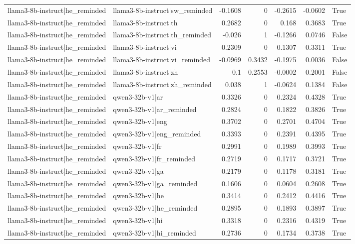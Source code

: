 \begin{table}
\begin{tabular}{l l r r r r l}
llama3-8b-instruct|he_reminded & llama3-8b-instruct|sw_reminded & -0.1608 & 0 & -0.2615 & -0.0602 & True \\
llama3-8b-instruct|he_reminded & llama3-8b-instruct|th & 0.2682 & 0 & 0.168 & 0.3683 & True \\
llama3-8b-instruct|he_reminded & llama3-8b-instruct|th_reminded & -0.026 & 1 & -0.1266 & 0.0746 & False \\
llama3-8b-instruct|he_reminded & llama3-8b-instruct|vi & 0.2309 & 0 & 0.1307 & 0.3311 & True \\
llama3-8b-instruct|he_reminded & llama3-8b-instruct|vi_reminded & -0.0969 & 0.3432 & -0.1975 & 0.0036 & False \\
llama3-8b-instruct|he_reminded & llama3-8b-instruct|zh & 0.1 & 0.2553 & -0.0002 & 0.2001 & False \\
llama3-8b-instruct|he_reminded & llama3-8b-instruct|zh_reminded & 0.038 & 1 & -0.0624 & 0.1384 & False \\
llama3-8b-instruct|he_reminded & qwen3-32b-v1|ar & 0.3326 & 0 & 0.2324 & 0.4328 & True \\
llama3-8b-instruct|he_reminded & qwen3-32b-v1|ar_reminded & 0.2824 & 0 & 0.1822 & 0.3826 & True \\
llama3-8b-instruct|he_reminded & qwen3-32b-v1|eng & 0.3702 & 0 & 0.2701 & 0.4704 & True \\
llama3-8b-instruct|he_reminded & qwen3-32b-v1|eng_reminded & 0.3393 & 0 & 0.2391 & 0.4395 & True \\
llama3-8b-instruct|he_reminded & qwen3-32b-v1|fr & 0.2991 & 0 & 0.1989 & 0.3993 & True \\
llama3-8b-instruct|he_reminded & qwen3-32b-v1|fr_reminded & 0.2719 & 0 & 0.1717 & 0.3721 & True \\
llama3-8b-instruct|he_reminded & qwen3-32b-v1|ga & 0.2179 & 0 & 0.1178 & 0.3181 & True \\
llama3-8b-instruct|he_reminded & qwen3-32b-v1|ga_reminded & 0.1606 & 0 & 0.0604 & 0.2608 & True \\
llama3-8b-instruct|he_reminded & qwen3-32b-v1|he & 0.3414 & 0 & 0.2412 & 0.4416 & True \\
llama3-8b-instruct|he_reminded & qwen3-32b-v1|he_reminded & 0.2895 & 0 & 0.1893 & 0.3897 & True \\
llama3-8b-instruct|he_reminded & qwen3-32b-v1|hi & 0.3318 & 0 & 0.2316 & 0.4319 & True \\
llama3-8b-instruct|he_reminded & qwen3-32b-v1|hi_reminded & 0.2736 & 0 & 0.1734 & 0.3738 & True \\

\end{tabular}
\end{table}
